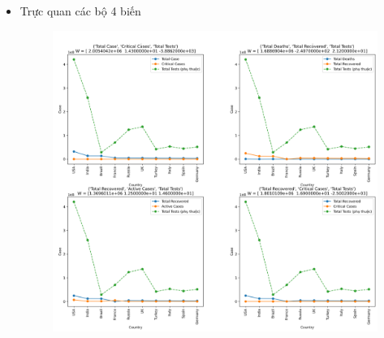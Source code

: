 \documentclass[a4paper, 12pt]{article}
\begin{document}
\begin{itemize}
        \item Trực quan các bộ 4 biến
        \begin{figure}[H]
            \begin{center}
                \includegraphics[scale=0.39]{img/relationship3Vars_1.png}
            \end{center}
        \end{figure}
        \begin{figure}[H]
            \begin{center}

\end{center}
\end{figure}
\end{itemize}
\end{document}
